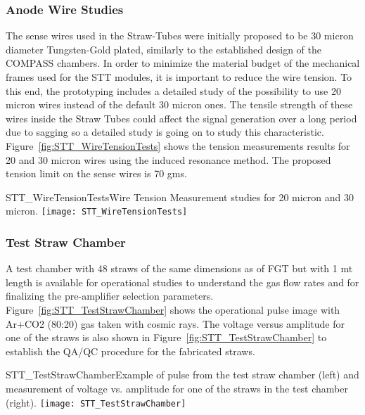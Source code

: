 \subsubsection{Anode Wire Studies} 

The sense wires used in the Straw-Tubes were initially proposed to be 30 micron diameter 
Tungsten-Gold plated, similarly to the established design of the COMPASS chambers. In order to minimize 
the material budget of the mechanical frames used for the STT modules, it is important to reduce 
the wire tension. To this end, the prototyping includes a detailed study of the possibility to use 
20 micron wires instead of the default 30 micron ones. The tensile strength of these wires inside the 
Straw Tubes could affect the signal generation over a long period due to sagging so a detailed study 
is going on to study this characteristic. Figure~\ref{fig:STT_WireTensionTests} shows 
the tension measurements results for 20 and 30 micron wires using the induced resonance method. 
The proposed tension limit on the sense wires is 70 gms.
\begin{cdrfigure}           
{STT_WireTensionTests}{Wire Tension Measurement studies for 20 micron and 30 micron.}
\texttt{[image: STT\_WireTensionTests]}
\end{cdrfigure}


\subsubsection{Test Straw Chamber} 

A test chamber with 48 straws of the same dimensions as of FGT but
with 1 mt length is available for operational studies to understand
the gas flow rates and for finalizing the pre-amplifier selection
parameters.  Figure~\ref{fig:STT_TestStrawChamber} shows the
operational pulse image with Ar+CO2 (80:20) gas taken with cosmic
rays. The voltage versus amplitude for one of the straws is also shown
in Figure~\ref{fig:STT_TestStrawChamber} to establish the QA/QC
procedure for the fabricated straws.
\begin{cdrfigure}  
{STT_TestStrawChamber}{Example of pulse from the test straw chamber (left) and 
measurement of voltage vs. amplitude for one of the straws in the test chamber (right).}
\texttt{[image: STT\_TestStrawChamber]}
\end{cdrfigure}


